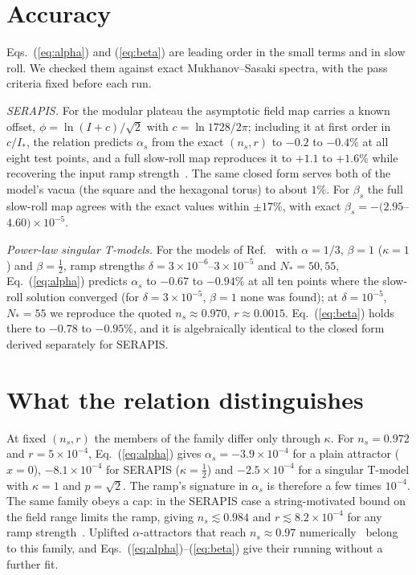 \documentclass[aps,prd,twocolumn,superscriptaddress,nofootinbib,showkeys]{revtex4-2}
\begin{document}
\section{Accuracy}
Eqs.~(\ref{eq:alpha}) and (\ref{eq:beta}) are leading order in the small terms and in slow roll. We checked them against exact Mukhanov--Sasaki spectra, with the pass criteria fixed before each run.

\emph{SERAPIS.} For the modular plateau the asymptotic field map carries a known offset, $\phi=\ln(I+c)/\sqrt2$ with $c=\ln1728/2\pi$; including it at first order in $c/I_*$, the relation predicts $\alpha_s$ from the exact $(n_s,r)$ to $-0.2$ to $-0.4\%$ at all eight test points, and a full slow-roll map reproduces it to $+1.1$ to $+1.6\%$ while recovering the input ramp strength~\cite{SERAPIS}. The same closed form serves both of the model's vacua (the square and the hexagonal torus) to about $1\%$. For $\beta_s$ the full slow-roll map agrees with the exact values within $\pm17\%$, with exact $\beta_s=-(2.95$--$4.60)\times10^{-5}$.

\emph{Power-law singular T-models.} For the models of Ref.~\cite{KL2025} with $\alpha=1/3$, $\beta=1$ ($\kappa=1$) and $\beta=\tfrac12$, ramp strengths $\delta=3\times10^{-6}$--$3\times10^{-5}$ and $N_*=50,55$, Eq.~(\ref{eq:alpha}) predicts $\alpha_s$ to $-0.67$ to $-0.94\%$ at all ten points where the slow-roll solution converged (for $\delta=3\times10^{-5}$, $\beta=1$ none was found); at $\delta=10^{-5}$, $N_*=55$ we reproduce the quoted $n_s\approx0.970$, $r\approx0.0015$. Eq.~(\ref{eq:beta}) holds there to $-0.78$ to $-0.95\%$, and it is algebraically identical to the closed form derived separately for SERAPIS.

\section{What the relation distinguishes}
At fixed $(n_s,r)$ the members of the family differ only through $\kappa$. For $n_s=0.972$ and $r=5\times10^{-4}$, Eq.~(\ref{eq:alpha}) gives $\alpha_s=-3.9\times10^{-4}$ for a plain attractor ($x=0$), $-8.1\times10^{-4}$ for SERAPIS ($\kappa=\tfrac12$) and $-2.5\times10^{-4}$ for a singular T-model with $\kappa=1$ and $p=\sqrt2$. The ramp's signature in $\alpha_s$ is therefore a few times $10^{-4}$. The same family obeys a cap: in the SERAPIS case a string-motivated bound on the field range limits the ramp, giving $n_s\lesssim0.984$ and $r\lesssim8.2\times10^{-4}$ for any ramp strength~\cite{SERAPIS}. Uplifted $\alpha$-attractors that reach $n_s\approx0.97$ numerically~\cite{KLY2026} belong to this family, and Eqs.~(\ref{eq:alpha})--(\ref{eq:beta}) give their running without a further fit.
\end{document}

